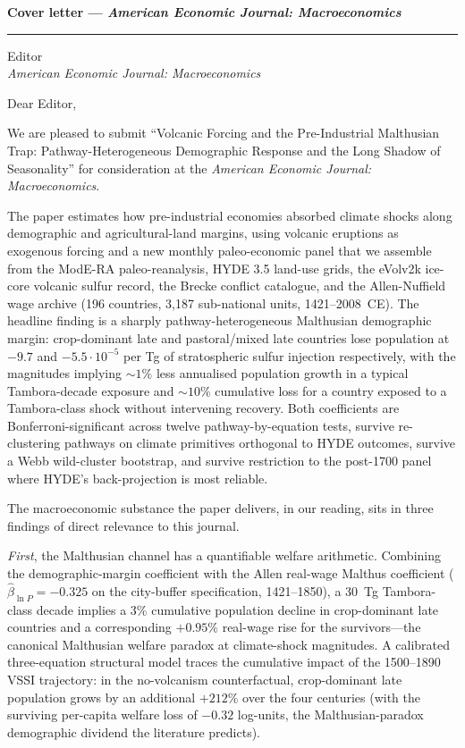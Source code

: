 \documentclass[11pt,letterpaper]{article}
\begin{document}
\noindent\textbf{Cover letter --- \emph{American Economic Journal: Macroeconomics}}\\[0.4em]
\textcolor{mutedgray}{\rule{0.22\linewidth}{0.4pt}}

\bigskip
\noindent Editor\\
\textit{American Economic Journal: Macroeconomics}

\bigskip

\noindent Dear Editor,

\bigskip

\noindent We are pleased to submit ``Volcanic Forcing and the Pre-Industrial Malthusian Trap: Pathway-Heterogeneous Demographic Response and the Long Shadow of Seasonality'' for consideration at the \emph{American Economic Journal: Macroeconomics}.

The paper estimates how pre-industrial economies absorbed climate shocks along demographic and agricultural-land margins, using volcanic eruptions as exogenous forcing and a new monthly paleo-economic panel that we assemble from the ModE-RA paleo-reanalysis, HYDE 3.5 land-use grids, the eVolv2k ice-core volcanic sulfur record, the Brecke conflict catalogue, and the Allen-Nuffield wage archive (196 countries, 3{,}187 sub-national units, 1421--2008~CE). The headline finding is a sharply pathway-heterogeneous Malthusian demographic margin: crop-dominant late and pastoral/mixed late countries lose population at $-9.7$ and $-5.5\!\cdot\!10^{-5}$ per Tg of stratospheric sulfur injection respectively, with the magnitudes implying $\sim 1\%$ less annualised population growth in a typical Tambora-decade exposure and $\sim 10\%$ cumulative loss for a country exposed to a Tambora-class shock without intervening recovery. Both coefficients are Bonferroni-significant across twelve pathway-by-equation tests, survive re-clustering pathways on climate primitives orthogonal to HYDE outcomes, survive a Webb wild-cluster bootstrap, and survive restriction to the post-1700 panel where HYDE's back-projection is most reliable.

The macroeconomic substance the paper delivers, in our reading, sits in three findings of direct relevance to this journal.

\emph{First}, the Malthusian channel has a quantifiable welfare arithmetic. Combining the demographic-margin coefficient with the Allen real-wage Malthus coefficient ($\hat\beta_{\ln P} = -0.325$ on the city-buffer specification, 1421--1850), a 30~Tg Tambora-class decade implies a 3\% cumulative population decline in crop-dominant late countries and a corresponding $+0.95\%$ real-wage rise for the survivors---the canonical Malthusian welfare paradox at climate-shock magnitudes. A calibrated three-equation structural model traces the cumulative impact of the 1500--1890 VSSI trajectory: in the no-volcanism counterfactual, crop-dominant late population grows by an additional $+212\%$ over the four centuries (with the surviving per-capita welfare loss of $-0.32$ log-units, the Malthusian-paradox demographic dividend the literature predicts).
\end{document}
